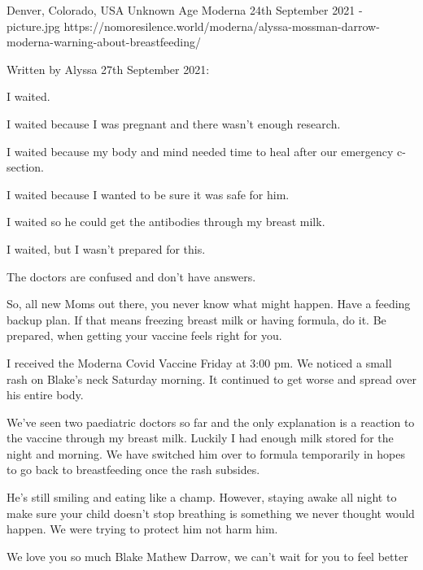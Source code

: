 {Denver, Colorado, USA}
{Unknown Age}
{Moderna}
{24th September 2021}
{-}
{picture.jpg}
{https://nomoresilence.world/moderna/alyssa-mossman-darrow-moderna-warning-about-breastfeeding/}
{

Written by Alyssa 27th September 2021:

I waited.

I waited because I was pregnant and there wasn’t enough research.

I waited because my body and mind needed time to heal after our emergency c-section.

I waited because I wanted to be sure it was safe for him.

I waited so he could get the antibodies through my breast milk.

I waited, but I wasn’t prepared for this.

The doctors are confused and don’t have answers.

So, all new Moms out there, you never know what might happen. Have a feeding
backup plan. If that means freezing breast milk or having formula, do it. Be
prepared, when getting your vaccine feels right for you.

I received the Moderna Covid Vaccine Friday at 3:00 pm. We noticed a small rash
on Blake’s neck Saturday morning. It continued to get worse and spread over
his entire body.

We’ve seen two paediatric doctors so far and the only explanation is a
reaction to the vaccine through my breast milk.
Luckily I had enough milk stored for the night and morning. We have switched
him over to formula temporarily in hopes to go back to breastfeeding once the
rash subsides.

He’s still smiling and eating like a champ. However, staying awake all night
to make sure your child doesn’t stop breathing is something we never thought
would happen. We were trying to protect him not harm him.

We love you so much Blake Mathew Darrow, we can’t wait for you to feel better
}
